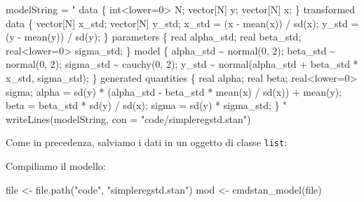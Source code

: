 \documentclass[
]{memoir}
\newenvironment{Shaded}{\begin{snugshade}}{\end{snugshade}}
\newcommand{\AttributeTok}[1]{\textcolor[rgb]{0.77,0.63,0.00}{#1}}
\newcommand{\FunctionTok}[1]{\textcolor[rgb]{0.00,0.00,0.00}{#1}}
\newcommand{\NormalTok}[1]{#1}
\newcommand{\OtherTok}[1]{\textcolor[rgb]{0.56,0.35,0.01}{#1}}
\newcommand{\SpecialCharTok}[1]{\textcolor[rgb]{0.00,0.00,0.00}{#1}}
\newcommand{\StringTok}[1]{\textcolor[rgb]{0.31,0.60,0.02}{#1}}
\begin{document}
\begin{Shaded}
\begin{Highlighting}[]
\NormalTok{modelString }\OtherTok{=} \StringTok{"}
\StringTok{data \{}
\StringTok{  int\textless{}lower=0\textgreater{} N;}
\StringTok{  vector[N] y;}
\StringTok{  vector[N] x;}
\StringTok{\}}
\StringTok{transformed data \{}
\StringTok{  vector[N] x\_std;}
\StringTok{  vector[N] y\_std;}
\StringTok{  x\_std = (x {-} mean(x)) / sd(x);}
\StringTok{  y\_std = (y {-} mean(y)) / sd(y);}
\StringTok{\}}
\StringTok{parameters \{}
\StringTok{  real alpha\_std;}
\StringTok{  real beta\_std;}
\StringTok{  real\textless{}lower=0\textgreater{} sigma\_std;}
\StringTok{\}}
\StringTok{model \{}
\StringTok{  alpha\_std \textasciitilde{} normal(0, 2);}
\StringTok{  beta\_std \textasciitilde{} normal(0, 2);}
\StringTok{  sigma\_std \textasciitilde{} cauchy(0, 2);}
\StringTok{  y\_std \textasciitilde{} normal(alpha\_std + beta\_std * x\_std, sigma\_std);}
\StringTok{\}}
\StringTok{generated quantities \{}
\StringTok{  real alpha;}
\StringTok{  real beta;}
\StringTok{  real\textless{}lower=0\textgreater{} sigma;}
\StringTok{  alpha = sd(y) * (alpha\_std {-} beta\_std * mean(x) / sd(x))}
\StringTok{           + mean(y);}
\StringTok{  beta = beta\_std * sd(y) / sd(x);}
\StringTok{  sigma = sd(y) * sigma\_std;}
\StringTok{\}}
\StringTok{"}
\FunctionTok{writeLines}\NormalTok{(modelString, }\AttributeTok{con =} \StringTok{"code/simpleregstd.stan"}\NormalTok{)}
\end{Highlighting}
\end{Shaded}

\noindent
Come in precedenza, salviamo i dati in un oggetto di classe \texttt{list}:

\begin{Shaded}
\end{Shaded}

\noindent
Compiliamo il modello:

\begin{Shaded}
\begin{Highlighting}[]
\NormalTok{file }\OtherTok{\textless{}{-}} \FunctionTok{file.path}\NormalTok{(}\StringTok{"code"}\NormalTok{, }\StringTok{"simpleregstd.stan"}\NormalTok{)}
\NormalTok{mod }\OtherTok{\textless{}{-}} \FunctionTok{cmdstan\_model}\NormalTok{(file)}
\end{Highlighting}
\end{Shaded}
\end{document}
